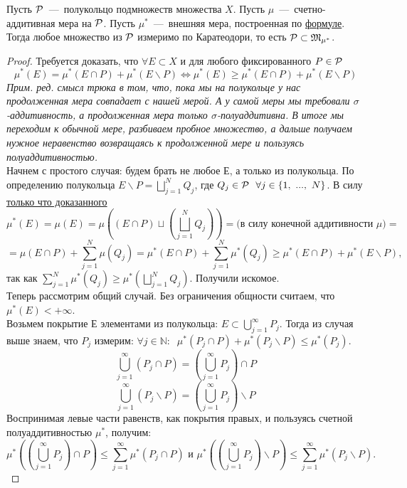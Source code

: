 \begin{theorem}
    Пусть $\mathcal{P}$~---~полукольцо подмножеств множества $X$. Пусть $\mu$~---~счетно-аддитивная мера на $\mathcal{P}$. Пусть $\mu^*$~---~внешняя мера, построенная по \hyperref[def:mu]{формуле}. Тогда любое множество из $\mathcal{P}$ измеримо по Каратеодори, то есть $\mathcal{P} \subset \mathfrak{M}_{\mu^*}$.
\end{theorem}
\begin{proof}
    Требуется доказать, что $\forall E \subset X$ и для любого фиксированного $P \in \mathcal{P}$
    \[
    \mu^*(E) = \mu^*(E \cap P) + \mu^*(E \backslash P) \Longleftrightarrow \mu^*(E) \geq \mu^*(E \cap P) + \mu^*(E \backslash P)
    \]
    \textit{
    Прим. ред. смысл трюка в том, что, пока мы на полукольце у нас продолженная мера совпадает с нашей мерой. А у самой меры мы требовали $\sigma$-аддитивность, а продолженная мера только $\sigma$-полуаддитивна. В итоге мы переходим к обычной мере, разбиваем пробное множество, а дальше получаем нужное неравенство возвращаясь к продолженной мере и пользуясь полуаддитивностью.} \\
    Начнем с простого случая: будем брать не любое Е, а только из полукольца. По определению полукольца $E \backslash P = \bigsqcup\limits_{j = 1}^N{Q_j}$, где $Q_j \in \PP~~\forall j \in \{1,\ ...,\ N\}$. В силу \hyperref[theorem10]{только что доказанного}
    \[
    \mu^*(E) = \mu(E) = \mu\left((E \cap P)\sqcup(\bigsqcup\limits_{j = 1}^N{Q_j})\right) = \text{(в силу конечной аддитивности }\mu) = 
    \]
    \[
    = \mu(E \cap P) + \sum\limits_{j = 1}^N{\mu(Q_j)} = \mu^*(E \cap P) + \sum\limits_{j = 1}^N{\mu^*(Q_j)} \geq \mu^*(E \cap P) + \mu^*(E \backslash P),
    \]
    так как $\sum\limits_{j = 1}^N{\mu^*(Q_j)} \geq \mu^*(\bigsqcup\limits_{j = 1}^N{Q_j})$. Получили искомое.\\

    Теперь рассмотрим общий случай. Без ограничения общности считаем, что $\mu^* (E) < +\infty$.\\
    Возьмем покрытие Е элементами из полукольца: $E \subset \bigcup\limits_{j = 1}^{\infty}{P_j}$. Тогда из случая выше знаем, что $P_j$ измерим: $\forall j \in \mathbb{N}: \ $ $\mu^*(P_j \cap P) + \mu^*(P_j \backslash P) \leq \mu^*(P_j)$.
    \[
    \bigcup\limits_{j = 1}^{\infty}{(P_j \cap P)} = (\bigcup\limits_{j = 1}^{\infty}{P_j}) \cap P
    \]
    \[
    \bigcup\limits_{j = 1}^{\infty}{(P_j \backslash P)} = (\bigcup\limits_{j = 1}^{\infty}{P_j}) \backslash P
    \]
    Воспринимая левые части равенств, как покрытия правых, и пользуясь счетной полуаддитивностью $\mu^*$, получим: 
    \[
    \mu^*\left((\bigcup\limits_{j = 1}^{\infty}{P_j}) \cap P\right) \leq \sum\limits_{j = 1}^{\infty}{\mu^*(P_j \cap P)} \text{ и }
    \mu^*\left((\bigcup\limits_{j = 1}^{\infty}{P_j}) \backslash P\right) \leq \sum\limits_{j = 1}^{\infty}{\mu^*(P_j \backslash P).}
    \]


\end{proof}
